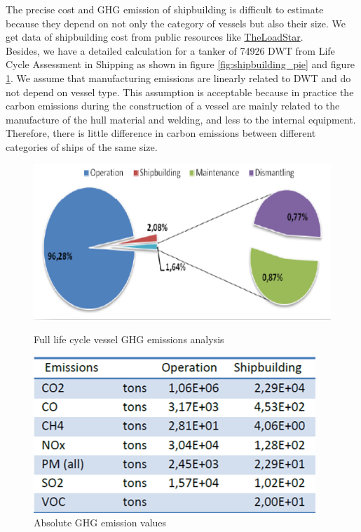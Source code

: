 \documentclass[a4paper,12pt]{article}
\begin{document}
The precise cost and GHG emission of shipbuilding is difficult to estimate because they depend on not only the category of vessels but also their size.  We get data of shipbuilding cost from public resources like \href{https://theloadstar.com/fleet-building-hmm-set-to-order-nine-methanol-powered-8000-teu-ships/}{TheLoadStar}.\\

Besides, we have a detailed calculation for a tanker of  74926 DWT from Life Cycle Assessment in Shipping \cite{chatzinikolaou2014applications} as shown in figure \ref{fig:shipbuilding_pie} and figure \ref{fig:shipbuilding_table}.
We assume that manufacturing emissions are linearly related to DWT and do not depend on vessel type.
This assumption is acceptable because in practice the carbon emissions during the construction of a vessel are mainly related to the manufacture of the hull material and welding, and less to the internal equipment.
Therefore, there is little difference in carbon emissions between different categories of ships of the same size.

\begin{figure}[htbp]
	\centering
	\begin{minipage}[t]{0.49\textwidth}
		\centering
		\includegraphics[width= \linewidth]{report-fig/shipbuilding_pie.png}
		\caption{Full life cycle vessel GHG emissions analysis}
		\label{fig:shipbuilding_pie}
	\end{minipage}
	\begin{minipage}[t]{0.49\textwidth}
		\centering
		\includegraphics[width=\linewidth]{report-fig/shipbuilding table.png}
		\caption{Absolute GHG emission values}
		\label{fig:shipbuilding_table}
	\end{minipage}
\end{figure}
\end{document}
